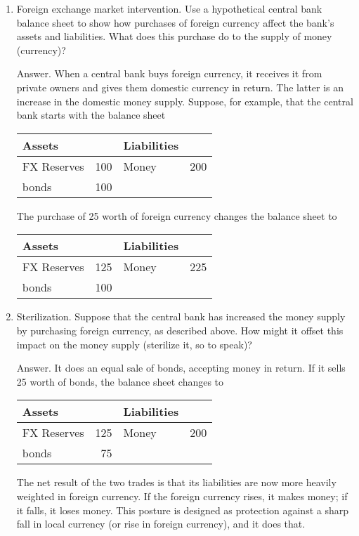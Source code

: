 \begin{enumerate}
\item Foreign exchange market intervention.
Use a hypothetical central bank  balance sheet to show how
purchases of foreign currency affect the bank's assets and liabilities. What does this purchase do to the supply of money (currency)?

Answer.  When a central bank  buys foreign currency,
it receives it from private owners and gives them
    domestic currency in return.
    The latter is an increase in the domestic money supply.
    Suppose, for example, that the central bank 
    starts with the balance sheet
\begin{center}
\begin{tabular}{lr|lr}
               Assets  &     &     Liabilities                     \\
               \hline
               FX Reserves &  100 &     Money  &  200   \\
               bonds   & 100 & \\
\end{tabular}
\end{center}
%
The purchase of 25 worth of foreign currency
changes the balance sheet to
%
\begin{center}
\begin{tabular}{lr|lr}
               Assets  &     &     Liabilities                     \\
               \hline
               FX Reserves &  125 &     Money  &  225   \\
               bonds   & 100 & \\
\end{tabular}
\end{center}
%

\item Sterilization.  Suppose that the central bank has increased the money supply by purchasing foreign currency, as described above.
    How might it offset this impact on the money supply (sterilize it, so to speak)?

Answer.  It does an equal sale of bonds, accepting money in return.
If it sells 25 worth of bonds, the balance sheet changes to
\begin{center}
\begin{tabular}{lr|lr}
               Assets  &     &     Liabilities                     \\
               \hline
               FX Reserves &  125 &     Money  &  200   \\
               bonds   & 75 & \\
\end{tabular}
\end{center}
%
The net result of the two trades is that its liabilities are now more heavily weighted in foreign currency.
If the foreign currency rises, it makes money; if it falls, it loses money.
This posture is designed as protection against a sharp fall in local currency (or rise in foreign currency), and it does that.


\end{enumerate}
